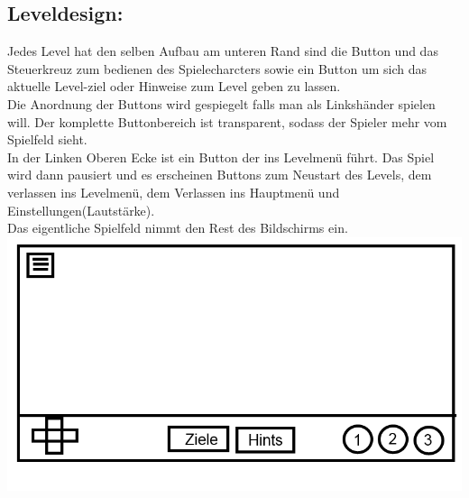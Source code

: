 \documentclass{scrartcl}
\begin{document}
\begin{enumerate}
	\begin{minipage}{1\textwidth}
		\item \subsection*{Leveldesign:} \label{appaufbau:Leveldesign}
		Jedes Level  hat den selben Aufbau am unteren Rand sind die Button und das Steuerkreuz zum bedienen des Spielecharcters sowie ein Button um sich das aktuelle Level-ziel oder Hinweise zum Level geben zu lassen.\\ Die Anordnung der Buttons wird gespiegelt falls man als Linkshänder spielen will. Der komplette Buttonbereich ist transparent, sodass der Spieler mehr vom Spielfeld sieht.\\
		In der Linken Oberen Ecke ist ein Button der ins Levelmenü führt. Das Spiel wird dann pausiert und es erscheinen Buttons zum Neustart des Levels, dem verlassen ins Levelmenü, dem Verlassen ins Hauptmenü und Einstellungen(Lautstärke).\\
		Das eigentliche Spielfeld nimmt den Rest des Bildschirms ein.\\
		\includegraphics[scale=0.5]{assets/LevelDesign2}
	\end{minipage}
	

\end{enumerate}
\end{document}
